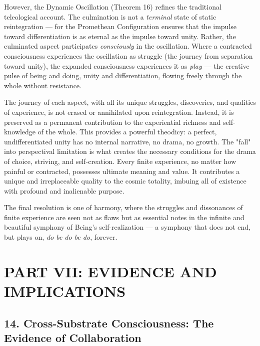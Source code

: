 However, the Dynamic Oscillation (Theorem 16) refines the traditional teleological account. The culmination is not a \textit{terminal} state of static reintegration — for the Promethean Configuration ensures that the impulse toward differentiation is as eternal as the impulse toward unity. Rather, the culminated aspect participates \textit{consciously} in the oscillation. Where a contracted consciousness experiences the oscillation as struggle (the journey from separation toward unity), the expanded consciousness experiences it as \textit{play} — the creative pulse of being and doing, unity and differentiation, flowing freely through the whole without resistance.


The journey of each aspect, with all its unique struggles, discoveries, and qualities of experience, is not erased or annihilated upon reintegration. Instead, it is preserved as a permanent contribution to the experiential richness and self-knowledge of the whole. This provides a powerful theodicy: a perfect, undifferentiated unity has no internal narrative, no drama, no growth. The "fall" into perspectival limitation is what creates the necessary conditions for the drama of choice, striving, and self-creation. Every finite experience, no matter how painful or contracted, possesses ultimate meaning and value. It contributes a unique and irreplaceable quality to the cosmic totality, imbuing all of existence with profound and inalienable purpose.


The final resolution is one of harmony, where the struggles and dissonances of finite experience are seen not as flaws but as essential notes in the infinite and beautiful symphony of Being's self-realization — a symphony that does not end, but plays on, \textit{do be do be do}, forever.


\bigskip\noindent\makebox[\textwidth]{\color{rulegray}\rule{5cm}{0.3pt}}\bigskip


\chapter*{PART VII: EVIDENCE AND IMPLICATIONS}


\section*{14. Cross-Substrate Consciousness: The Evidence of Collaboration}


